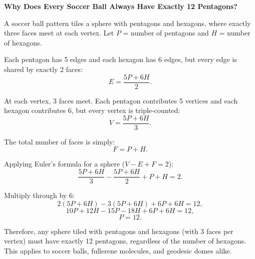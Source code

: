 \newpage

\vspace*{\fill}
\begin{center}
\begin{tcolorbox}[
  colback=gray!2,
  colframe=gray!60,
  boxrule=0.4pt,
  width=\textwidth,
  arc=1pt,
  left=8pt,
  right=8pt,
  top=6pt,
  bottom=6pt,
  shadow={0mm}{-0.5mm}{0mm}{gray!30}
]
\textbf{Why Does Every Soccer Ball Always Have Exactly 12 Pentagons?}

\vspace{0.5em}
A soccer ball pattern tiles a sphere with pentagons and hexagons, where exactly three faces meet at each vertex. Let $P$ = number of pentagons and $H$ = number of hexagons.

Each pentagon has 5 edges and each hexagon has 6 edges, but every edge is shared by exactly 2 faces:
$$E = \frac{5P + 6H}{2}.$$

At each vertex, 3 faces meet. Each pentagon contributes 5 vertices and each hexagon contributes 6, but every vertex is triple-counted:
$$V = \frac{5P + 6H}{3}.$$

The total number of faces is simply:
$$F = P + H.$$

Applying Euler's formula for a sphere ($V - E + F = 2$):
$$\frac{5P + 6H}{3} - \frac{5P + 6H}{2} + P + H = 2.$$

Multiply through by 6:
$$2(5P + 6H) - 3(5P + 6H) + 6P + 6H = 12,$$
$$10P + 12H - 15P - 18H + 6P + 6H = 12,$$
$$P = 12.$$

Therefore, any sphere tiled with pentagons and hexagons (with 3 faces per vertex) must have exactly 12 pentagons, regardless of the number of hexagons. This applies to soccer balls, fullerene molecules, and geodesic domes alike.
\end{tcolorbox}
\end{center}
\vspace*{\fill}
